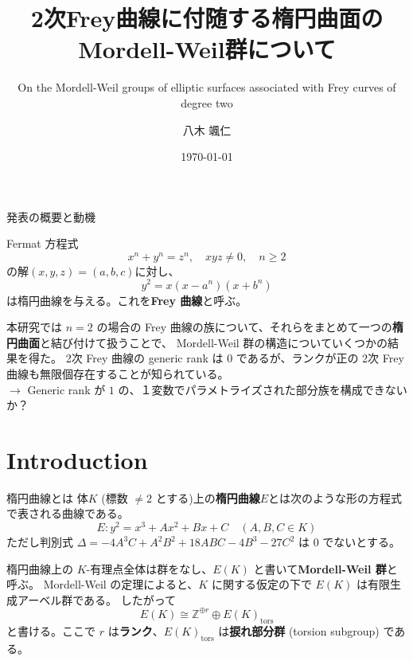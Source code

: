 \documentclass{classes/mybeamer}
\title{2次Frey曲線に付随する楕円曲面のMordell-Weil群について}
\subtitle{On the Mordell-Weil groups of elliptic surfaces associated with Frey curves of degree two}
\author{八木 颯仁}
\institute{慶應義塾大学 栗原研究室 修士2年}
\date{\today}
\begin{document}
\begin{frame}
    \titlepage
\end{frame}

\begin{frame}{発表の概要と動機}
    \begin{dfn*}
        Fermat 方程式
        \begin{equation}
            x^n + y^n = z^n, \quad xyz \neq 0, \quad n \geq 2
        \end{equation}
        の解$(x, y, z)=(a,b,c)$に対し、
        \begin{equation}
            y^2 = x (x-a^n) (x+b^n)
        \end{equation}
        は楕円曲線を与える。これを\color{blue}\textbf{Frey 曲線}\color{black}と呼ぶ。
    \end{dfn*}
    本研究では $n=2$ の場合の Frey 曲線の族について、それらをまとめて一つの\textbf{楕円曲面}と結び付けて扱うことで、 Mordell-Weil 群の構造についていくつかの結果を得た。
    2次 Frey 曲線の generic rank は $0$ であるが、ランクが正の 2次 Frey 曲線も無限個存在することが知られている。\\
    \hspace{2em} $\rightarrow$ Generic rank が $1$ の、１変数でパラメトライズされた部分族を構成できないか？
    \tableofcontents
\end{frame}

\section{Introduction}
\begin{frame}{楕円曲線とは}
    体$K$ (標数 $\neq2$ とする)上の\color{blue}\textbf{楕円曲線}\color{black}$E$とは次のような形の方程式で表される曲線である。
    \begin{equation*}
        E: y^{2} = x^{3} + Ax^2 + Bx + C \quad (A,B,C \in K)
    \end{equation*}
    ただし判別式 $\Delta = -4A^3C + A^2B^2 + 18ABC - 4B^3 - 27C^2$ は $0$ でないとする。

    \vspace{1cm}

    楕円曲線上の $K$-有理点全体は群をなし、$E(K)$ と書いて\color{blue}\textbf{Mordell-Weil 群}\color{black}と呼ぶ。
    Mordell-Weil の定理によると、$K$ に関する仮定の下で $E(K)$ は有限生成アーベル群である。
    したがって
    \begin{equation*}
        E(K) \cong \mathbb{Z}^{\oplus r} \oplus E(K)_{\mathrm{tors}}
    \end{equation*}
    と書ける。ここで $r$ は\color{blue}\textbf{ランク}\color{black}、$E(K)_{\mathrm{tors}}$ は\color{blue}\textbf{捩れ部分群}\color{black} (torsion subgroup) である。
\end{frame}
\end{document}
